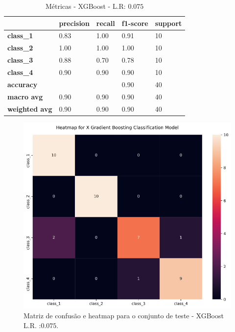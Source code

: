 \documentclass[
	article,			%
	11pt,				%
	oneside,			%
	a4paper,			%
	english,			%
	brazil,				%
	sumario=tradicional
	]{abntex2}
\begin{document}
\newpage
\begin{table}[H]
\centering
\begin{tabular}{l|l|l|l|l|}
\cline{2-5}
                                            & \textbf{precision} & \textbf{recall} & \textbf{f1-score} & \textbf{support} \\ \hline
\multicolumn{1}{|l|}{\textbf{class\_1}}     & 0.83               & 1.00            & 0.91              & 10               \\ \hline
\multicolumn{1}{|l|}{\textbf{class\_2}}     & 1.00               & 1.00            & 1.00              & 10               \\ \hline
\multicolumn{1}{|l|}{\textbf{class\_3}}     & 0.88               & 0.70            & 0.78              & 10               \\ \hline
\multicolumn{1}{|l|}{\textbf{class\_4}}     & 0.90               & 0.90            & 0.90              & 10               \\ \hline
\multicolumn{1}{|l|}{\textbf{accuracy}}     &                    &                 & 0.90              & 40               \\ \hline
\multicolumn{1}{|l|}{\textbf{macro avg}}    & 0.90               & 0.90            & 0.90              & 40               \\ \hline
\multicolumn{1}{|l|}{\textbf{weighted avg}} & 0.90               & 0.90            & 0.90              & 40               \\ \hline
\end{tabular}
\caption{Métricas - XGBoost - L.R: $0.075$}
\label{tab:xgb_01}
\end{table}


\begin{figure}[H]
 \centering
 \includegraphics[scale=0.5]{fig/xgb_cm.png}
 \caption{Matriz de confusão e heatmap para o conjunto de teste - XGBoost L.R. :$0.075$.}
 \label{fig:xgb_cm}
\end{figure}
\end{document}
